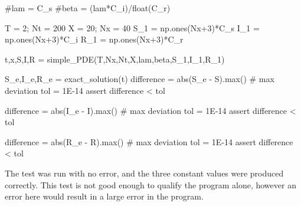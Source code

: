 \documentclass[%
twoside,                 %
final,                   %
chapterprefix=true,      %
open=right               %
10pt]{book}
\begin{document}
    #lam = C_s
    #beta = (lam*C_i)/float(C_r)
    
    T = 2; Nt = 200
    X = 20; Nx = 40
    S_1 = np.ones(Nx+3)*C_s
    I_1 = np.ones(Nx+3)*C_i
    R_1 = np.ones(Nx+3)*C_r
    
    t,x,S,I,R = simple_PDE(T,Nx,Nt,X,lam,beta,S_1,I_1,R_1)
    
    S_e,I_e,R_e = exact_solution(t)
    difference = abs(S_e - S).max()  # max deviation
    tol = 1E-14
    assert difference < tol

    difference = abs(I_e - I).max()  # max deviation
    tol = 1E-14
    assert difference < tol

    difference = abs(R_e - R).max()  # max deviation
    tol = 1E-14
    assert difference < tol
\epycod

The test was run with no error, and the three constant values were produced correctly. This test is not good enough to qualify the program alone, however an error here would result in a large error in the program. 
\end{document}
